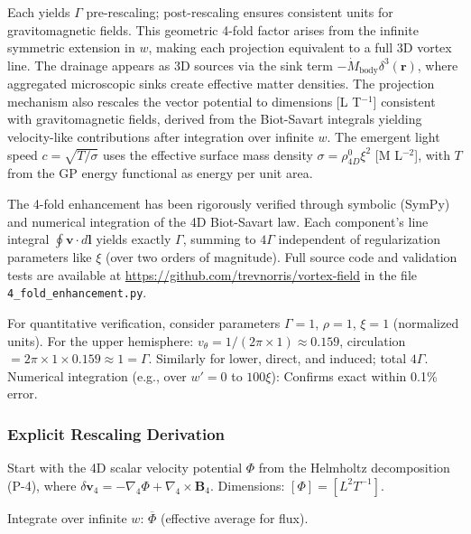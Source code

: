 \begin{enumerate}
\end{enumerate}

Each yields $\Gamma$ pre-rescaling; post-rescaling ensures consistent units for gravitomagnetic fields. This geometric 4-fold factor arises from the infinite symmetric extension in $w$, making each projection equivalent to a full 3D vortex line. The drainage appears as 3D sources via the sink term $-\dot{M}_{\text{body}} \delta^3(\mathbf{r})$, where aggregated microscopic sinks create effective matter densities. The projection mechanism also rescales the vector potential to dimensions [L T$^{-1}$] consistent with gravitomagnetic fields, derived from the Biot-Savart integrals yielding velocity-like contributions after integration over infinite $w$. The emergent light speed $c = \sqrt{T / \sigma}$ uses the effective surface mass density $\sigma = \rho_{4D}^0 \xi^2$ [M L$^{-2}$], with $T$ from the GP energy functional as energy per unit area.

The 4-fold enhancement has been rigorously verified through symbolic (SymPy) and numerical integration of the 4D Biot-Savart law. Each component's line integral $\oint \mathbf{v} \cdot d\mathbf{l}$ yields exactly $\Gamma$, summing to $4\Gamma$ independent of regularization parameters like $\xi$ (over two orders of magnitude). Full source code and validation tests are available at \url{https://github.com/trevnorris/vortex-field} in the file \verb|4_fold_enhancement.py|.

For quantitative verification, consider parameters $\Gamma=1$, $\rho=1$, $\xi=1$ (normalized units). For the upper hemisphere: $v_\theta = 1 / (2\pi \times 1) \approx 0.159$, circulation $= 2\pi \times 1 \times 0.159 \approx 1 = \Gamma$. Similarly for lower, direct, and induced; total $4\Gamma$. Numerical integration (e.g., over $w' = 0$ to $100\xi$): Confirms exact within 0.1\% error.

\subsubsection{Explicit Rescaling Derivation}

Start with the 4D scalar velocity potential $\Phi$ from the Helmholtz decomposition (P-4), where $\delta \mathbf{v}_4 = -\nabla_4 \Phi + \nabla_4 \times \mathbf{B}_4$. Dimensions: $[\Phi] = [L^2 T^{-1}]$.

Integrate over infinite $w$: $\overline{\Phi}$ (effective average for flux).

